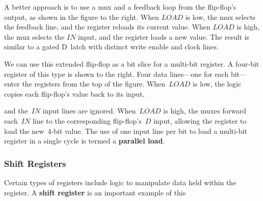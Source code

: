 \begin{minipage}{4.25in}
A better approach is to use a mux and a feedback loop from the 
flip-flop's output, as shown in the figure to the right.  
%
When $LOAD$ is low, the mux selects the feedback line, and the 
register reloads its current value.  
%
When $LOAD$ is high, the mux selects the $IN$ input, and the register 
loads a new value.  
%
The result is similar to a gated D~latch with distinct write enable 
and clock lines.
\end{minipage}\hspace{.25in}%
\begin{minipage}{2in}
\end{minipage}\vspace{4pt}

\begin{minipage}{1.25in}
We can use this extended flip-flop as a bit slice for a multi-bit register.
%
A four-bit register of this type
is shown to the right.  Four data \mbox{lines---one} for each
\mbox{bit---enter} the registers from the top of the figure.  
When~$LOAD$ is low, the logic copies each flip-flop's value back to its
input,\linebreak
\end{minipage}\hspace{.25in}%
\begin{minipage}{5in}
\end{minipage}\mpdone

and the~$IN$ input lines are ignored.  When~$LOAD$ is high,
the muxes forward each~$IN$ line to the corresponding flip-flop's~$D$
input, allowing the register to load the new~\mbox{4-bit} value.
The use of one input line per bit to load a multi-bit
register in a single cycle is termed a {\bf parallel load}.\\

\subsubsection{Shift Registers}

\begin{minipage}{1.25in}
Certain types of registers include logic to manipulate data held
within the register.  A {\bf shift register} is an important example
of this\linebreak
\end{minipage}\hspace{.25in}%
\begin{minipage}{5in}
\vspace{12pt}
\end{minipage}\mpdone

